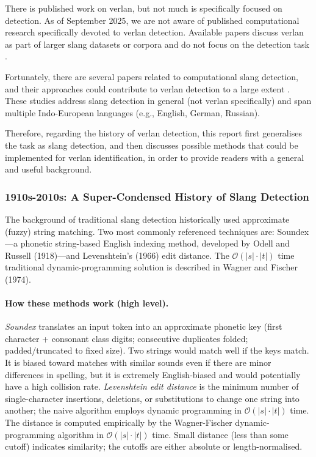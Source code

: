 \documentclass[12pt]{article}
\begin{document}
There is published work on verlan, but not much is specifically focused on detection. As of September 2025, we are not aware of published computational research specifically devoted to verlan detection. Available papers discuss verlan as part of larger slang datasets or corpora and do not focus on the detection task \cite{zurbuchen2024, podhorna2020rapcor, mekki2021tremolo, panckhurst202088milsms}.

Fortunately, there are several papers related to computational slang detection, and their approaches could contribute to verlan detection to a large extent \cite{pei2019slang, sun2024informal, slangornot2024, wu2018slangsd}. These studies address slang detection in general (not verlan specifically) and span multiple Indo-European languages (e.g., English, German, Russian).

Therefore, regarding the history of verlan detection, this report first generalises the task as slang detection, and then discusses possible methods that could be implemented for verlan identification, in order to provide readers with a general and useful background.

\subsubsection{1910s-2010s: A Super-Condensed History of Slang Detection}

The background of traditional slang detection historically used approximate (fuzzy) string matching. Two most commonly referenced techniques are: Soundex\;---\;a phonetic string-based English indexing method, developed by Odell and Russell (1918)\;---\;and Levenshtein's (1966) edit distance. The \( \mathcal{O}(|s|\cdot|t|) \) time traditional dynamic-programming solution is described in Wagner and Fischer (1974). \cite{russell1918soundex,levenshtein1966,wagner1974string}

\paragraph{How these methods work (high level).} \textit{Soundex} translates an input token into an approximate phonetic key (first character + consonant class digits; consecutive duplicates folded; padded/truncated to fixed size). Two strings would match well if the keys match. It is biased toward matches with similar sounds even if there are minor differences in spelling, but it is extremely English-biased and would potentially have a high collision rate. \textit{Levenshtein edit distance} is the minimum number of single-character insertions, deletions, or substitutions to change one string into another; the naive algorithm employs dynamic programming in \( \mathcal{O}(|s|\cdot|t|) \) time. The distance is computed empirically by the Wagner-Fischer dynamic-programming algorithm in \( \mathcal{O}(|s|\cdot|t|) \) time. Small distance (less than some cutoff) indicates similarity; the cutoffs are either absolute or length-normalised. \cite{wagner1974string}
\end{document}
